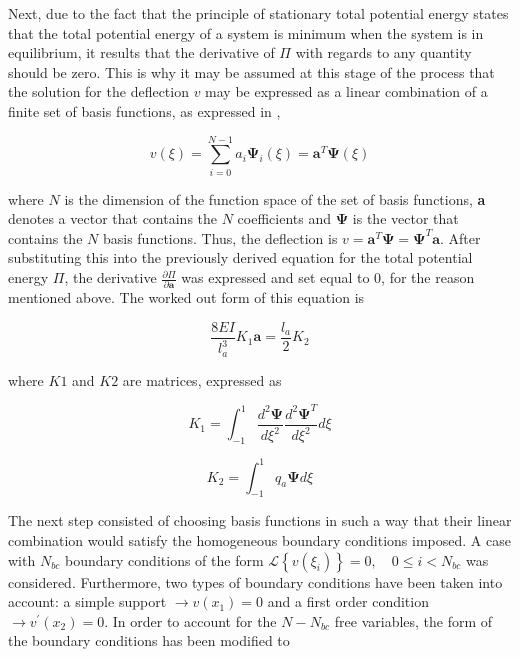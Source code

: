Next, due to the fact that the principle of stationary total potential energy states that the total potential energy of a system is minimum when the system is in equilibrium, it results that the derivative of $\Pi$ with regards to any quantity should be zero. This is why it may be assumed at this stage of the process that the solution for the deflection $v$ may be expressed as a linear combination of a finite set of basis functions, as expressed in ,

\begin{equation}
\label{eq:basis_functions}
    v(\xi)=\sum_{i=0}^{N-1} a_{i} \mathbf{\Psi}_{i}(\xi)=\mathbf{a}^{T} \mathbf{\Psi}(\xi)
\end{equation}

\noindent where $N$ is the dimension of the function space of the set of basis functions, \textbf{a} denotes a vector that contains the $N$ coefficients and $\mathbf{\Psi}$ is the vector that contains the $N$ basis functions. Thus, the deflection is $v=\mathbf{a}^{T} \boldsymbol{\Psi}=\boldsymbol{\Psi}^{T} \mathbf{a}$. After substituting this into the previously derived equation for the total potential energy $\Pi$, the derivative $\frac{\partial \Pi}{\partial \mathbf{a}}$ was expressed and set equal to 0, for the reason mentioned above. The worked out form of this equation is 

\begin{equation}
\label{eq:derivative}
    \frac{8 E I}{l_{a}^{3}} K_{1} \mathbf{a}=\frac{l_{a}}{2} K_{2}
\end{equation}

where $K1$ and $K2$ are matrices, expressed as

\begin{equation}
\label{eq:K1}
    K_{1}=\int_{-1}^{1} \frac{d^{2} \mathbf{\Psi}}{d \xi^{2}} \frac{d^{2} \mathbf{\Psi}^{T}}{d \xi^{2}} d \xi
\end{equation}

\begin{equation}
\label{eq:K2}
   K_{2}=\int_{-1}^{1} q_{a} \mathbf{\Psi} d \xi
\end{equation}

The next step consisted of choosing basis functions in such a way that their linear combination would satisfy the homogeneous boundary conditions imposed. A case with $N_{bc}$ boundary conditions of the form $\mathcal{L}\left\{v\left(\xi_{i}\right)\right\}=0, \quad 0 \leq i<N_{b c}$ was considered. Furthermore, two types of boundary conditions have been taken into account: a simple support $\rightarrow v\left(x_{1}\right)=0$ and a first order condition $\rightarrow v^{\prime}\left(x_{2}\right)=0$. In order to account for the $N-N_{bc}$ free variables, the form of the boundary conditions has been modified to

